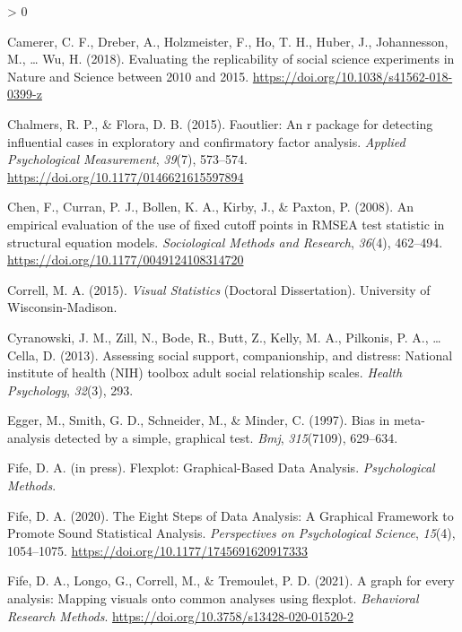 \documentclass[
  english,
  man]{apa6}
\newlength{\cslhangindent}
\newenvironment{CSLReferences}[2] %
 {%
  \setlength{\parindent}{0pt}
  \ifodd #1 \everypar{\setlength{\hangindent}{\cslhangindent}}\ignorespaces\fi
  \ifnum #2 > 0
  \setlength{\parskip}{#2\baselineskip}
  \fi
 }%
 {}
\begin{document}
\begin{CSLReferences}{1}{0}
\leavevmode\hypertarget{ref-Camerer2018}{}%
Camerer, C. F., Dreber, A., Holzmeister, F., Ho, T. H., Huber, J., Johannesson, M., \ldots{} Wu, H. (2018). {Evaluating the replicability of social science experiments in Nature and Science between 2010 and 2015}. \url{https://doi.org/10.1038/s41562-018-0399-z}

\leavevmode\hypertarget{ref-faoutlier}{}%
Chalmers, R. P., \& Flora, D. B. (2015). Faoutlier: An r package for detecting influential cases in exploratory and confirmatory factor analysis. \emph{Applied Psychological Measurement}, \emph{39}(7), 573--574. \url{https://doi.org/10.1177/0146621615597894}

\leavevmode\hypertarget{ref-Chen2008}{}%
Chen, F., Curran, P. J., Bollen, K. A., Kirby, J., \& Paxton, P. (2008). {An empirical evaluation of the use of fixed cutoff points in RMSEA test statistic in structural equation models}. \emph{Sociological Methods and Research}, \emph{36}(4), 462--494. \url{https://doi.org/10.1177/0049124108314720}

\leavevmode\hypertarget{ref-Correll2015}{}%
Correll, M. A. (2015). \emph{{Visual Statistics}} (Doctoral Dissertation). University of Wisconsin-Madison.

\leavevmode\hypertarget{ref-cyranowski2013assessing}{}%
Cyranowski, J. M., Zill, N., Bode, R., Butt, Z., Kelly, M. A., Pilkonis, P. A., \ldots{} Cella, D. (2013). Assessing social support, companionship, and distress: National institute of health (NIH) toolbox adult social relationship scales. \emph{Health Psychology}, \emph{32}(3), 293.

\leavevmode\hypertarget{ref-egger1997bias}{}%
Egger, M., Smith, G. D., Schneider, M., \& Minder, C. (1997). Bias in meta-analysis detected by a simple, graphical test. \emph{Bmj}, \emph{315}(7109), 629--634.

\leavevmode\hypertarget{ref-Fife_flexplot}{}%
Fife, D. A. (in press). {Flexplot: Graphical-Based Data Analysis}. \emph{Psychological Methods}.

\leavevmode\hypertarget{ref-Fife2019e}{}%
Fife, D. A. (2020). {The Eight Steps of Data Analysis: A Graphical Framework to Promote Sound Statistical Analysis}. \emph{Perspectives on Psychological Science}, \emph{15}(4), 1054--1075. \url{https://doi.org/10.1177/1745691620917333}

\leavevmode\hypertarget{ref-Fifemapping}{}%
Fife, D. A., Longo, G., Correll, M., \& Tremoulet, P. D. (2021). A graph for every analysis: Mapping visuals onto common analyses using flexplot. \emph{Behavioral Research Methods}. \url{https://doi.org/10.3758/s13428-020-01520-2}


\end{CSLReferences}
\end{document}
